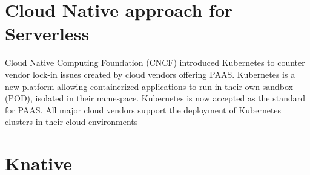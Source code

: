 \documentclass{article}
\begin{document}
\section{Cloud Native approach for Serverless}
\begin{flushleft}
Cloud Native Computing Foundation (\gls{CNCF}) introduced Kubernetes to counter vendor lock-in issues created by cloud vendors offering \gls{PAAS}. Kubernetes is a new platform allowing containerized applications to run in their own sandbox (\gls{POD}), isolated in their namespace.
Kubernetes is now accepted as the standard for \gls{PAAS}. All major cloud vendors support the deployment of Kubernetes clusters in their cloud environments
\end{flushleft}
\section{Knative }
\end{document}
